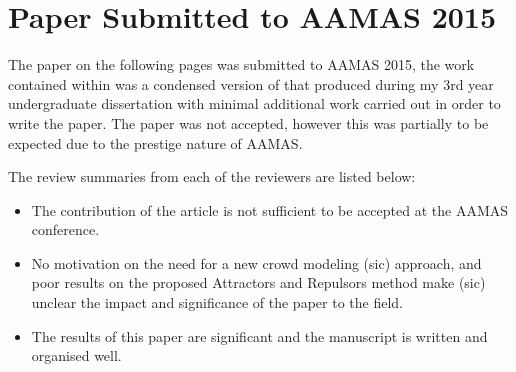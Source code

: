 \newpage

\chapter{Paper Submitted to AAMAS 2015\label{appendix:a}}
The paper on the following pages was submitted to AAMAS 2015, the work contained within was a condensed version of that produced during my 3rd year undergraduate dissertation with minimal additional work carried out in order to write the paper. The paper was not accepted, however this was partially to be expected due to the prestige nature of AAMAS.

The review summaries from each of the reviewers are listed below:

\begin{itemize}
  \item The contribution of the article is not sufficient to be accepted at the AAMAS conference.
  \item No motivation on the need for a new crowd modeling (sic) approach, and poor results on the proposed Attractors and Repulsors method make (sic) unclear the impact and significance of the paper to the field.
  \item The results of this paper are significant and the manuscript is written and organised well.
\end{itemize}


